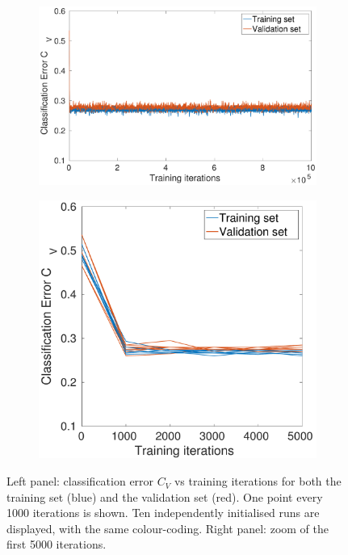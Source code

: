 \documentclass[12pt,titlepage]{article}
\begin{document}
\vspace*{-0.3cm}
\begin{figure}[H]
\centering
    \begin{subfigure}[b]{0.58\textwidth}
        \includegraphics[width=\textwidth]{../Figures/noHL_error.pdf}
        \caption{}
    \end{subfigure} %
    \hfill %
    \begin{subfigure}[b]{0.4\textwidth}
        \includegraphics[width=\textwidth]{../Figures/noHL_error_focus.pdf}
        \caption{}
    \end{subfigure} %
\caption{\footnotesize Left panel: classification error $C_V$ vs training iterations for both the training set (blue) and the validation set (red). One point every 1000 iterations is shown. Ten independently initialised runs are displayed, with the same colour-coding. Right panel: zoom of the first 5000 iterations.}
\label{fig:2b}
\end{figure}
\end{document}
